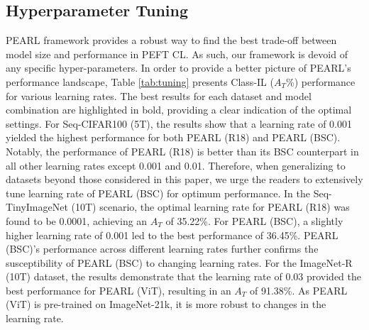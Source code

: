 \documentclass[10pt]{article} %
\begin{document}
\subsection{Hyperparameter Tuning}\label{appendix:hyperparam_tuning}
PEARL framework provides a robust way to find the best trade-off between model size and performance in PEFT CL. As such, our framework is devoid of any specific hyper-parameters. In order to provide a better picture of PEARL's performance landscape, Table \ref{tab:tuning} presents Class-IL ($A_T$\%) performance for various learning rates. The best results for each dataset and model combination are highlighted in bold, providing a clear indication of the optimal settings. For Seq-CIFAR100 (5T), the results show that a learning rate of 0.001 yielded the highest performance for both PEARL (R18) and PEARL (BSC). Notably, the performance of PEARL (R18) is better than its BSC counterpart in all other learning rates except 0.001 and 0.01. Therefore, when generalizing to datasets beyond those considered in this paper, we urge the readers to extensively tune learning rate of PEARL (BSC) for optimum performance. In the Seq-TinyImageNet (10T) scenario, the optimal learning rate for PEARL (R18) was found to be 0.0001, achieving an $A_T$ of 35.22\%. For PEARL (BSC), a slightly higher learning rate of 0.001 led to the best performance of 36.45\%. PEARL (BSC)'s performance across different learning rates further confirms the susceptibility of PEARL (BSC) to changing learning rates. For the ImageNet-R (10T) dataset, the results demonstrate that the learning rate of 0.03 provided the best performance for PEARL (ViT), resulting in an $A_T$ of 91.38\%. As PEARL (ViT) is pre-trained on ImageNet-21k, it is more robust to changes in the learning rate. 
\end{document}
